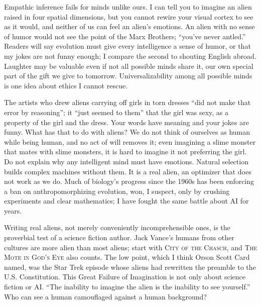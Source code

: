 Empathic inference fails for minds unlike ours. I can tell you to imagine an alien raised in four spatial dimensions, but you cannot rewire your visual cortex to see as it would, and neither of us can feel an alien's emotions. An alien with no sense of humor would not see the point of the Marx Brothers; ``you've never antled.'' Readers will say evolution must give every intelligence a sense of humor, or that my jokes are not funny enough; I compare the second to shouting English abroad.  Laughter may be valuable even if not all possible minds share it, our own special part of the gift we give to tomorrow. Universalizability among all possible minds is one idea about ethics I cannot rescue.

The artists who drew aliens carrying off girls in torn dresses ``did not make that error by reasoning''; it ``just seemed to them'' that the girl was sexy, as a property of the girl and the dress. Your words have meaning and your jokes are funny. What has that to do with aliens? We do not think of ourselves as human while being human, and no act of will removes it; even imagining a slime monster that mates with slime monsters, it is hard to imagine it not preferring the girl. Do not explain why any intelligent mind must have emotions. Natural selection builds complex machines without them. It is a real alien, an optimizer that does not work as we do. Much of biology's progress since the 1960s has been enforcing a ban on anthropomorphizing evolution, won, I suspect, only by crushing experiments and clear mathematics; I have fought the same battle about AI for years. 

Writing real aliens, not merely conveniently incomprehensible ones, is the proverbial test of a science fiction author. Jack Vance's humans from other cultures are more alien than most aliens; start with \textsc{City of the Chasch}, and \textsc{The Mote in God's Eye} also counts. The low point, which I think Orson Scott Card named, was the Star Trek episode whose aliens had rewritten the preamble to the U.S. Constitution. This Great Failure of Imagination is not only about science fiction or AI. ``The inability to imagine the alien is the inability to see yourself.'' Who can see a human camouflaged against a human background?
